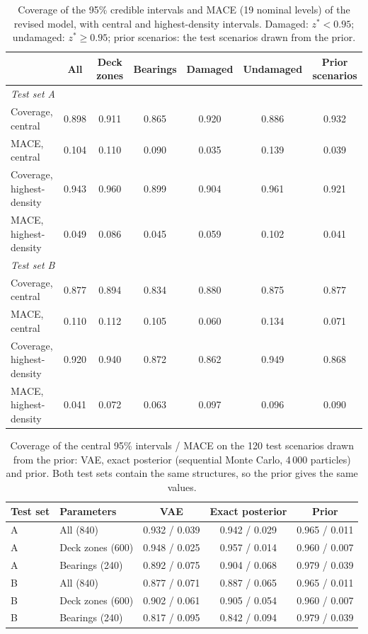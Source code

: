 \documentclass[11pt]{article}
\begin{document}
\begin{table}[H]
\centering\small
\caption{Coverage of the 95\% credible intervals and MACE (19 nominal levels) of the revised model, with central and
highest-density intervals. Damaged: $z^*<0.95$; undamaged: $z^*\ge0.95$; prior scenarios: the test scenarios drawn from the
prior.}
\label{tab:coverage}
\footnotesize\setlength{\tabcolsep}{4pt}
\begin{tabular}{lcccccc}
\toprule
 & All & Deck zones & Bearings & Damaged & Undamaged & Prior scenarios \\
\midrule
\multicolumn{7}{l}{\textit{Test set A}} \\
Coverage, central & 0.898 & 0.911 & 0.865 & 0.920 & 0.886 & 0.932 \\
MACE, central & 0.104 & 0.110 & 0.090 & 0.035 & 0.139 & 0.039 \\
Coverage, highest-density & 0.943 & 0.960 & 0.899 & 0.904 & 0.961 & 0.921 \\
MACE, highest-density & 0.049 & 0.086 & 0.045 & 0.059 & 0.102 & 0.041 \\
\midrule
\multicolumn{7}{l}{\textit{Test set B}} \\
Coverage, central & 0.877 & 0.894 & 0.834 & 0.880 & 0.875 & 0.877 \\
MACE, central & 0.110 & 0.112 & 0.105 & 0.060 & 0.134 & 0.071 \\
Coverage, highest-density & 0.920 & 0.940 & 0.872 & 0.862 & 0.949 & 0.868 \\
MACE, highest-density & 0.041 & 0.072 & 0.063 & 0.097 & 0.096 & 0.090 \\
\bottomrule
\end{tabular}
\end{table}

\begin{table}[H]
\centering\small
\caption{Coverage of the central 95\% intervals / MACE on the 120 test scenarios drawn from the prior: VAE, exact posterior
(sequential Monte Carlo, 4\,000 particles) and prior. Both test sets contain the same structures, so the prior gives the same
values.}
\label{tab:coverage_exact}
\begin{tabular}{llccc}
\toprule
Test set & Parameters & VAE & Exact posterior & Prior \\
\midrule
A & All (840) & 0.932 / 0.039 & 0.942 / 0.029 & 0.965 / 0.011 \\
A & Deck zones (600) & 0.948 / 0.025 & 0.957 / 0.014 & 0.960 / 0.007 \\
A & Bearings (240) & 0.892 / 0.075 & 0.904 / 0.068 & 0.979 / 0.039 \\
\midrule
B & All (840) & 0.877 / 0.071 & 0.887 / 0.065 & 0.965 / 0.011 \\
B & Deck zones (600) & 0.902 / 0.061 & 0.905 / 0.054 & 0.960 / 0.007 \\
B & Bearings (240) & 0.817 / 0.095 & 0.842 / 0.094 & 0.979 / 0.039 \\
\bottomrule
\end{tabular}
\end{table}
\end{document}
